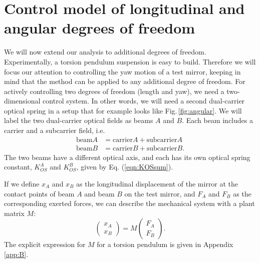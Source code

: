 
\section{Control model of longitudinal and angular degrees of freedom}
\label{sec:III} 

We will now extend our analysis to additional degrees of freedom. Experimentally, a torsion pendulum suspension is  easy to build. Therefore we will focus our attention to controlling the yaw motion of a test mirror, keeping in mind that the method can be applied to any additional degree of freedom. For actively controlling two degrees of freedom (length and yaw), we need a two-dimensional control system. In other words, we will need a second dual-carrier optical spring in a setup that for example looks like Fig.\,\ref{fig:angular}. We will label the two dual-carrier optical fields as beams $A$ and $B$. Each beam includes a carrier and a subcarrier field, i.e.
\begin{align}
\mbox{beam} A &= \mbox{carrier} A + \mbox{subcarrier} A \nonumber \\
\mbox{beam} B &= \mbox{carrier} B + \mbox{subcarrier} B.
\label{eqn:beams}
\end{align}
The two beams have a different optical axis, and each has its own optical spring constant, $K_{OS}^A$ and $K_{OS}^B$, given by Eq. (\ref{eqn:KOSsum}).

If we define $x_A$ and $x_B$ as the longitudinal displacement of the mirror at the contact points
of beam $A$ and beam $B$ on the test mirror,
 and $F_A$ and $F_B$ as the corresponding exerted forces, we can describe the mechanical system with a plant matrix $M$:
\begin{equation}
 \begin{pmatrix}
x_A\\ x_B
\end{pmatrix} 
=
M \begin{pmatrix}
F_{A}\\ F_{B}
\end{pmatrix}.
\label{eq:MF}
\end{equation}
The explicit expression for $M$ for a torsion pendulum is given in Appendix \ref{app:B}.


